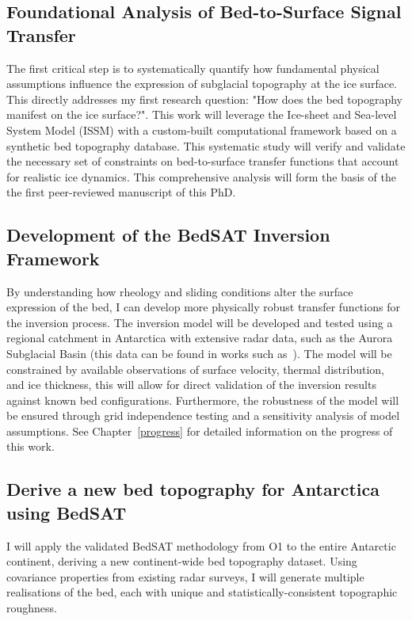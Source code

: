 \subsection{Foundational Analysis of Bed-to-Surface Signal Transfer}\label{paper1}
The first critical step is to systematically quantify how fundamental physical assumptions influence the expression of subglacial topography at the ice surface.
This directly addresses my first research question: "How does the bed topography manifest on the ice surface?". This work will leverage the Ice-sheet and Sea-level System Model (ISSM) with a custom-built computational framework based on a synthetic bed topography database. This systematic study will verify and validate the necessary set of constraints on bed-to-surface transfer functions that account for realistic ice dynamics. This comprehensive analysis will form the basis of the the first peer-reviewed manuscript of this PhD.

\subsection{Development of the BedSAT Inversion Framework}
By understanding how rheology and sliding conditions alter the surface expression of the bed, I can develop more physically robust transfer functions for the inversion process. The inversion model will be developed and tested using a regional catchment in Antarctica with extensive radar data, such as the Aurora Subglacial Basin (this data can be found in works such as~\cite{Young_2011}). The model will be constrained by available observations of surface velocity, thermal distribution, and ice thickness, this will allow for direct validation of the inversion results against known bed configurations. Furthermore, the robustness of the model will be ensured through grid independence testing and a sensitivity analysis of model assumptions. See Chapter~\ref{progress} for detailed information on the progress of this work.

\subsection{Derive a new bed topography for Antarctica using BedSAT}
I will apply the validated BedSAT methodology from O1 to the entire Antarctic continent, deriving a new continent-wide bed topography dataset. Using covariance properties from existing radar surveys, I will generate multiple realisations of the bed, each with unique and statistically-consistent topographic roughness.

